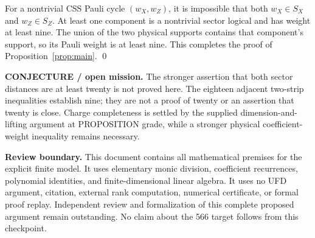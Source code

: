 \documentclass{article}
\begin{document}
For a nontrivial CSS Pauli cycle \((w_X, w_Z)\), it is impossible that both
\(w_X \in S_X\) and \(w_Z \in S_Z\). At least one component is a nontrivial sector logical
and has weight at least nine. The union of the two physical supports contains that
component's support, so its Pauli weight is at least nine. This completes the proof of
Proposition~\ref{prop:main}. \qed

\textbf{CONJECTURE / open mission.} The stronger assertion that both sector distances are at
least twenty is not proved here. The eighteen adjacent two-strip inequalities establish nine;
they are not a proof of twenty or an assertion that twenty is close. Charge completeness is
settled by the supplied dimension-and-lifting argument at PROPOSITION grade, while a stronger
physical coefficient-weight inequality remains necessary.

\textbf{Review boundary.} This document contains all mathematical premises for the explicit
finite model. It uses elementary monic division, coefficient recurrences, polynomial
identities, and finite-dimensional linear algebra. It uses no UFD argument, citation, external
rank computation, numerical certificate, or formal proof replay. Independent review and
formalization of this complete proposed argument remain outstanding. No claim about the 566
target follows from this checkpoint.
\end{document}
